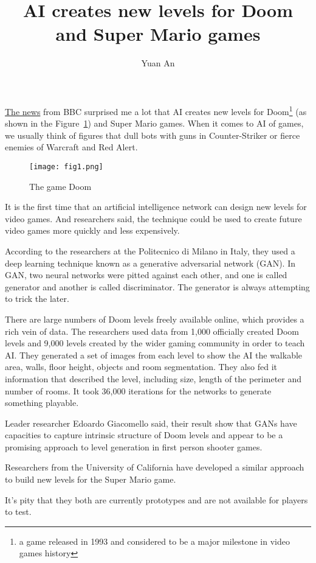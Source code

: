 \documentclass[a4paper,12pt,twocolumn]{article}
\title{AI creates new levels for Doom and Super Mario games}
\author{Yuan An}
\begin{document}
\maketitle
\href{http://www.bbc.com/news/technology-44040007}{The news} from BBC surprised me a lot that AI creates new levels for Doom\footnote{a game released in 1993 and considered to be a major milestone in video games history} (as shown in the Figure~\ref{fig1}) and Super Mario games\cite{BBCnews}. When it comes to AI of games, we usually think of figures that dull bots with guns in Counter-Striker or fierce enemies of Warcraft and Red Alert.
\begin{figure}[h]
	\centering
	\texttt{[image: fig1.png]}
	\caption{The game Doom}\label{fig1}
\end{figure}
\par
It is the first time that an artificial intelligence network can design new levels for video games. And researchers said, the technique could be used to create future video games more quickly and less expensively.
\par
According to the researchers at the Politecnico di Milano in Italy, they used a deep learning technique known as a generative adversarial network (GAN). In GAN, two neural networks were pitted against each other, and one is called generator and another is called discriminator. The generator is always attempting to trick the later.
\par
There are large numbers of Doom levels freely available online, which provides a rich vein of data. The researchers used data from 1,000 officially created Doom levels and 9,000 levels created by the wider gaming community in order to teach AI. They generated a set of images from each level to show the AI the walkable area, walls, floor height, objects and room segmentation. They also fed it information that described the level, including size, length of the perimeter and number of rooms. It took 36,000 iterations for the networks to generate something playable.
\par
Leader researcher Edoardo Giacomello said, their result show that GANs have capacities to capture intrinsic structure of Doom levels and appear to be a promising approach to level generation in first person shooter games.
\par
Researchers from the University of California have developed a similar approach to build new levels for the Super Mario game.
\par
It's pity that they both are currently  prototypes and are not available for players to test.


\end{document}
